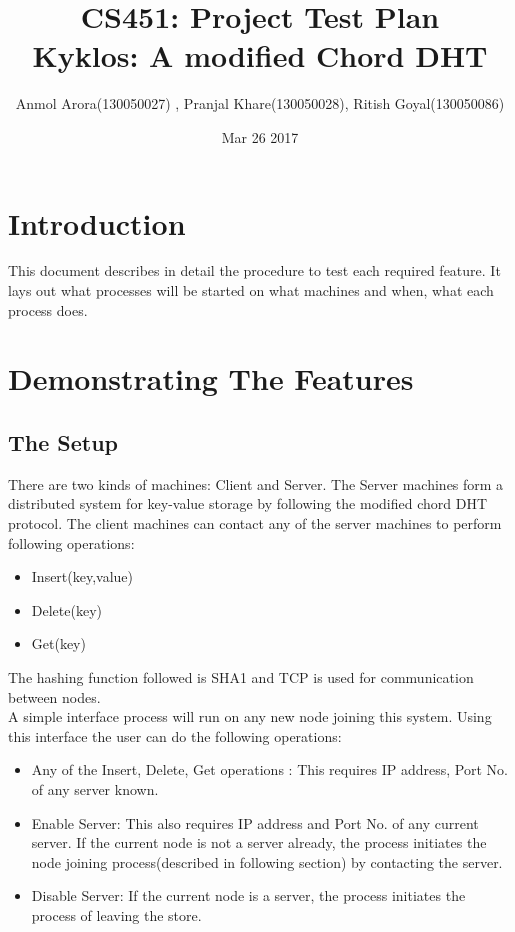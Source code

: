\documentclass{article}
\begin{document}
\author{Anmol Arora(130050027) , Pranjal Khare(130050028), Ritish Goyal(130050086)}
\title{CS451: Project Test Plan   \\
    Kyklos: A modified Chord DHT}
\date{Mar 26 2017}
\maketitle

\section{Introduction}
This document describes in detail the procedure to test each required feature. It lays out what processes will be started on what machines and when, what each process does.

\section{Demonstrating The Features}
\subsection{The Setup}
There are two kinds of machines: Client and Server. The Server machines form a distributed system for key-value storage by following the modified chord DHT protocol.
The client machines can contact any of the server machines to perform following operations:
\begin{itemize}
    \item Insert(key,value)
    \item Delete(key)
    \item Get(key) 
\end{itemize}
The hashing function followed is SHA1 and TCP is used for communication between nodes.\\
A simple interface process will run on any new node joining this system. Using this interface the user can do the following operations:
\begin{itemize}
    \item Any of the Insert, Delete, Get operations : This requires IP address, Port No. of any server known.
    \item Enable Server: This also requires IP address and Port No. of any current server. If the current node is not a server already, the process initiates the node joining process(described in following section) by contacting the server. 
    \item Disable Server: If the current node is a server, the process initiates the process of leaving the store. 
\end{itemize}
\end{document}
